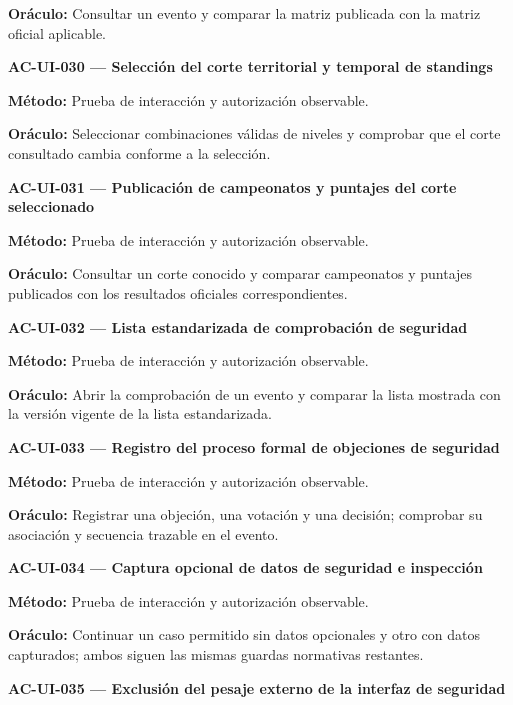 \documentclass[10pt,letterpaper]{article}
\begin{document}
\textbf{Oráculo:} Consultar un evento y comparar la matriz publicada con la matriz oficial aplicable.\par\vspace{0.45em}
\noindent\textbf{AC-UI-030 --- Selección del corte territorial y temporal de standings}\par
\textbf{Método:} Prueba de interacción y autorización observable.\par
\textbf{Oráculo:} Seleccionar combinaciones válidas de niveles y comprobar que el corte consultado cambia conforme a la selección.\par\vspace{0.45em}
\noindent\textbf{AC-UI-031 --- Publicación de campeonatos y puntajes del corte seleccionado}\par
\textbf{Método:} Prueba de interacción y autorización observable.\par
\textbf{Oráculo:} Consultar un corte conocido y comparar campeonatos y puntajes publicados con los resultados oficiales correspondientes.\par\vspace{0.45em}
\noindent\textbf{AC-UI-032 --- Lista estandarizada de comprobación de seguridad}\par
\textbf{Método:} Prueba de interacción y autorización observable.\par
\textbf{Oráculo:} Abrir la comprobación de un evento y comparar la lista mostrada con la versión vigente de la lista estandarizada.\par\vspace{0.45em}
\noindent\textbf{AC-UI-033 --- Registro del proceso formal de objeciones de seguridad}\par
\textbf{Método:} Prueba de interacción y autorización observable.\par
\textbf{Oráculo:} Registrar una objeción, una votación y una decisión; comprobar su asociación y secuencia trazable en el evento.\par\vspace{0.45em}
\noindent\textbf{AC-UI-034 --- Captura opcional de datos de seguridad e inspección}\par
\textbf{Método:} Prueba de interacción y autorización observable.\par
\textbf{Oráculo:} Continuar un caso permitido sin datos opcionales y otro con datos capturados; ambos siguen las mismas guardas normativas restantes.\par\vspace{0.45em}
\noindent\textbf{AC-UI-035 --- Exclusión del pesaje externo de la interfaz de seguridad}\par
\end{document}
